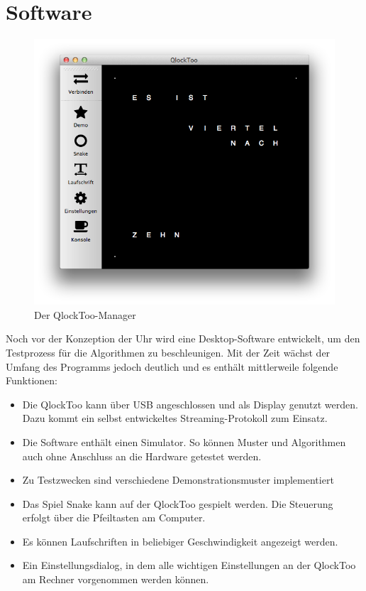 \section{Software}
\label{sec:Software}
%
\begin{figure}[h]
    \centering
    \includegraphics[width=\columnwidth]{Abbildungen/Screenshot}
    \caption[QlockToo-Manager]{Der QlockToo-Manager}
    \label{fig:Manager}
\end{figure}
%
Noch vor der Konzeption der Uhr wird eine Desktop-Software entwickelt, um den Testprozess für die Algorithmen zu beschleunigen. Mit der Zeit wächst der Umfang des Programms jedoch deutlich und es enthält mittlerweile folgende Funktionen:

\begin{itemize}
\item Die QlockToo kann über USB angeschlossen und als Display genutzt werden. Dazu kommt ein selbst entwickeltes Streaming-Protokoll zum Einsatz.
\item Die Software enthält einen Simulator. So können Muster und Algorithmen auch ohne Anschluss an die Hardware getestet werden.
\item Zu Testzwecken sind verschiedene Demonstrationsmuster implementiert
\item Das Spiel Snake kann auf der QlockToo gespielt werden. Die Steuerung erfolgt über die Pfeiltasten am Computer.
\item Es können Laufschriften in beliebiger Geschwindigkeit angezeigt werden.
\item Ein Einstellungsdialog, in dem alle wichtigen Einstellungen an der QlockToo am Rechner vorgenommen werden können.
\end{itemize}

